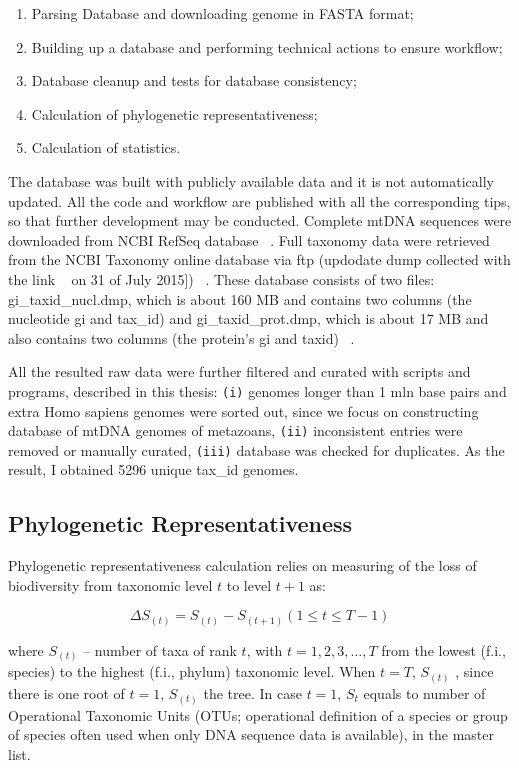 \documentclass[a4paper,11pt]{article}
\begin{document}
\begin{enumerate}
\item Parsing Database and downloading genome in FASTA format;
\item Building up a database and performing technical actions to ensure workflow;
\item Database cleanup and tests for database consistency;
\item Calculation of phylogenetic representativeness;
\item Calculation of statistics.
\end{enumerate}

The database was built with publicly available data and it is not automatically updated. All the
code and workflow are published with all the corresponding tips, so that further development
may be conducted. Complete mtDNA sequences were downloaded from NCBI RefSeq
database ~\cite{pruitt2005ncbi}. Full taxonomy data were retrieved from the NCBI Taxonomy on­line database via
ftp (up­do­date dump collected with the link ~\cite{nbbidump} on 31 of July 2015]) ~\cite{federhen2012ncbi}. These database
consists of two files: gi\_taxid\_nucl.dmp, which is about 160 MB and contains two columns (the
nucleotide gi and tax\_id) and gi\_taxid\_prot.dmp, which is about 17 MB and also contains two
columns (the protein's gi and taxid) ~\cite{ncbireadme}.

All the resulted raw data were further filtered and curated with scripts and programs, described
in this thesis: \texttt{(i)} genomes longer than 1 mln base pairs and extra Homo sapiens genomes were
sorted out, since we focus on constructing database of mtDNA genomes of metazoans, \texttt{(ii)}
inconsistent entries were removed or manually curated, \texttt{(iii)} database was checked for
duplicates. As the result, I obtained 5296 unique tax\_id genomes.

\subsection*{Phylogenetic Representativeness}
Phylogenetic representativeness calculation relies on measuring of the loss of
biodiversity from taxonomic level $t$ to level $t+1$ as:

\begin{equation*}
\Delta S_{(t)}=S_{(t)}-S_{(t+1)}{(1\leq t \leq T -1)}
\end{equation*}

where $S_{(t)}$ -- number of taxa of rank $t$, with $t = 1,2,3,\ldots,T$ from the lowest (f.i., species) to the highest (f.i., phylum) taxonomic level. When $t=T$, $S_{(t)}$ , since there is one root of $t = 1$, $S_{(t)}$ the tree. In case $t=1$, $S_{t}$ equals to number of Operational Taxonomic Units (OTUs; operational definition of a species or group of species often used when only DNA sequence data is available), in the master list.
\end{document}
